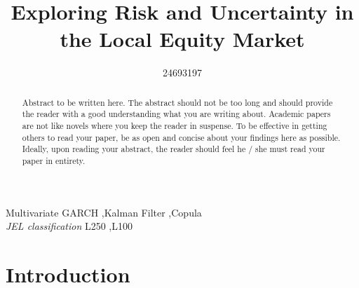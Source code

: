 \documentclass[11pt,preprint, authoryear]{elsarticle}
\numberwithin{equation}{section}
\numberwithin{figure}{section}
\numberwithin{table}{section}
\begin{document}
\begin{frontmatter}  %

\title{Exploring Risk and Uncertainty in the Local Equity Market}





\author[Add1]{24693197}





\address[Add1]{Stellenbosch University, Stellenbosch, South Africa}


\begin{abstract}
\small{
Abstract to be written here. The abstract should not be too long and
should provide the reader with a good understanding what you are writing
about. Academic papers are not like novels where you keep the reader in
suspense. To be effective in getting others to read your paper, be as
open and concise about your findings here as possible. Ideally, upon
reading your abstract, the reader should feel he / she must read your
paper in entirety.
}
\end{abstract}

\vspace{1cm}


\begin{keyword}
\footnotesize{
Multivariate GARCH \sep Kalman Filter \sep Copula \\
\vspace{0.3cm}
}
\footnotesize{
\textit{JEL classification} L250 \sep L100
}
\end{keyword}



\vspace{0.5cm}

\end{frontmatter}



\pagestyle{fancy}
\chead{}
\rhead{}
\lfoot{}
\lhead{}
\cfoot{}


\headsep 35pt %




\section{\texorpdfstring{Introduction
\label{Introduction}}{Introduction }}\label{introduction}
\end{document}
